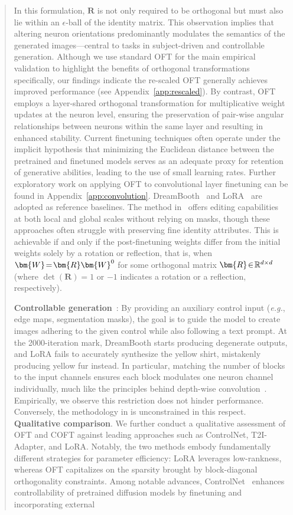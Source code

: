 \begin{abstract}
In this formulation, $\bm{R}$ is not only required to be orthogonal but must also lie within an $\epsilon$-ball of the identity matrix. This observation implies that altering neuron orientations predominantly modulates the semantics of the generated images—central to tasks in subject-driven and controllable generation. Although we use standard OFT for the main empirical validation to highlight the benefits of orthogonal transformations specifically, our findings indicate the re-scaled OFT generally achieves improved performance (see Appendix~\ref{app:rescaled}). By contrast, OFT employs a layer-shared orthogonal transformation for multiplicative weight updates at the neuron level, ensuring the preservation of pair-wise angular relationships between neurons within the same layer and resulting in enhanced stability. Current finetuning techniques often operate under the implicit hypothesis that minimizing the Euclidean distance between the pretrained and finetuned models serves as an adequate proxy for retention of generative abilities, leading to the use of small learning rates. Further exploratory work on applying OFT to convolutional layer finetuning can be found in Appendix~\ref{app:convolution}. DreamBooth~\cite{ruiz2023dreambooth} and LoRA~\cite{hulora2022} are adopted as reference baselines. The method in~\cite{hertz2022prompt} offers editing capabilities at both local and global scales without relying on masks, though these approaches often struggle with preserving fine identity attributes. This is achievable if and only if the post-finetuning weights differ from the initial weights solely by a rotation or reflection, that is, when $\thickmuskip=2mu \medmuskip=2mu \bm{W}=\bm{R}\bm{W}^0$ for some orthogonal matrix $\thickmuskip=2mu \medmuskip=2mu \bm{R}\in\mathbb{R}^{d\times d}$ (where $\det(\bm{R})=1$ or $-1$ indicates a rotation or a reflection, respectively). \item \textbf{Controllable generation}~\cite{zhang2023adding,mou2023t2i}: By providing an auxiliary control input (\emph{e.g.}, edge maps, segmentation masks), the goal is to guide the model to create images adhering to the given control while also following a text prompt. At the 2000-iteration mark, DreamBooth starts producing degenerate outputs, and LoRA fails to accurately synthesize the yellow shirt, mistakenly producing yellow fur instead. In particular, matching the number of blocks to the input channels ensures each block modulates one neuron channel individually, much like the principles behind depth-wise convolution~\cite{chollet2017xception}. Empirically, we observe this restriction does not hinder performance. Conversely, the methodology in \cite{liu2021orthogonal} is unconstrained in this respect. \textbf{Qualitative comparison}. We further conduct a qualitative assessment of OFT and COFT against leading approaches such as ControlNet, T2I-Adapter, and LoRA. Notably, the two methods embody fundamentally different strategies for parameter efficiency: LoRA leverages low-rankness, whereas OFT capitalizes on the sparsity brought by block-diagonal orthogonality constraints. Among notable advances, ControlNet~\cite{zhang2023adding} enhances controllability of pretrained diffusion models by finetuning and incorporating external 
\end{abstract}
